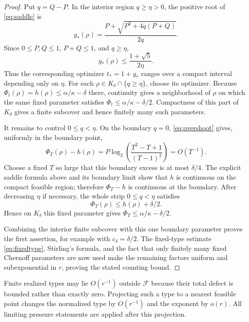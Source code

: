 \documentclass[11pt]{amsart}
\newcommand{\Fcal}{\mathcal F}
\begin{document}
\begin{proof}
Put \(q=Q-P\).  In the interior region \(q\ge\eta>0\), the positive
root of \eqref{eq:saddle} is
\[
 y_*(\rho)
 =\frac{P+\sqrt{P^2+4q(P+Q)}}{2q}.
\]
Since \(0\le P,Q\le1\), \(P+Q\le1\), and \(q\ge\eta\),
\[
 y_*(\rho)\le \frac{1+\sqrt5}{2\eta}.
\]
Thus the corresponding optimizer \(t_*=1+y_*\) ranges over a compact
interval depending only on \(\eta\).  For each
\(\rho\in K_\delta\cap\{q\ge\eta\}\), choose its optimizer.  Because
\(\Phi_t(\rho)=h(\rho)\le\alpha/\kappa-\delta\) there, continuity gives
a neighborhood of \(\rho\) on which the same fixed parameter satisfies
\(\Phi_t\le\alpha/\kappa-\delta/2\).  Compactness of this part of
\(K_\delta\) gives a finite subcover and hence finitely many such
parameters.

It remains to control \(0\le q<\eta\).  On the boundary \(q=0\),
\eqref{eq:overshoot} gives, uniformly in the boundary point,
\[
 \Phi_T(\rho)-h(\rho)
 =P\log_2\!\left(\frac{T^2-T+1}{(T-1)^2}\right)
 =O(T^{-1}).
\]
Choose a fixed \(T\) so large that this boundary excess is at most
\(\delta/4\).  The explicit saddle formula above and its boundary limit
show that \(h\) is continuous on the compact feasible region; therefore
\(\Phi_T-h\) is continuous at the boundary.  After decreasing \(\eta\)
if necessary, the whole strip \(0\le q<\eta\) satisfies
\[
 \Phi_T(\rho)\le h(\rho)+\delta/2.
\]
Hence on \(K_\delta\) this fixed parameter gives
\(\Phi_T\le\alpha/\kappa-\delta/2\).

Combining the interior finite subcover with this one boundary parameter
proves the first assertion, for example with \(c_\delta=\delta/2\).
The fixed-type estimate \eqref{eq:fixedtype}, Stirling's formula, and the
fact that only finitely many fixed Chernoff parameters are now used make
the remaining factors uniform and subexponential in \(r\), proving the
stated counting bound.
\end{proof}

Finite realized types may lie \(O(r^{-1})\) outside \(\Fcal\) because their total defect is bounded rather than exactly zero.  Projecting such a type to a nearest feasible point changes the normalized type by \(O(r^{-1})\) and the exponent by \(o(r)\).  All limiting pressure statements are applied after this projection.
\end{document}
